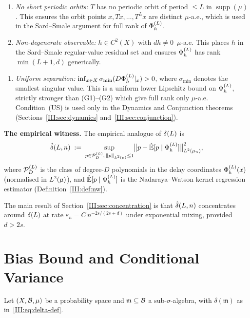 \begin{enumerate}[label=(G\arabic*)]
  \item \emph{No short periodic orbits:}
    $T$ has no periodic orbit of period $\leq L$ in $\operatorname{supp}(\mu)$.
    This ensures the orbit points $x, Tx, \ldots, T^L x$ are distinct
    $\mu$-a.e., which is used in the Sard--Smale argument for full rank of
    $\Phi_h^{(L)}$.

  \item \emph{Non-degenerate observable:}
    $h \in C^2(X)$ with $dh \neq 0$~$\mu$-a.e.
    This places $h$ in the Sard--Smale regular-value residual set and
    ensures $\Phi_h^{(L)}$ has rank $\min(L+1,d)$ generically.
\end{enumerate}

\begin{enumerate}[label=(US)]
  \item \emph{Uniform separation:}
    $\inf_{x \in X} \sigma_{\min}(D\Phi_h^{(L)}|_x) > 0$,
    where $\sigma_{\min}$ denotes the smallest singular value.
    This is a uniform lower Lipschitz bound on $\Phi_h^{(L)}$, strictly stronger than
    (G1)--(G2) which give full rank only $\mu$-a.e.
    Condition~(US) is used only in the Dynamics and Conjunction theorems
    (Sections~\ref{III:sec:dynamics} and~\ref{III:sec:conjunction}).
\end{enumerate}

\textbf{The empirical witness.}\enspace
The empirical analogue of $\delta(L)$ is
\[
  \hat{\delta}(L,n)
  \;:=\;
  \sup_{p \in \mathcal{P}_D^{(L)},\, \|p\|_{L^{2}(\mu)} \leq 1}
  \bigl\|p - \hat{\mathbb{E}}[p \mid \Phi_h^{(L)}]\bigr\|_{L^{2}(\mu_n)}^2,
\]
where $\mathcal{P}_D^{(L)}$ is the class of degree-$D$ polynomials in the delay coordinates
$\Phi_h^{(L)}(x)$ (normalised in $L^{2}(\mu)$), and $\hat{\mathbb{E}}[p \mid \Phi_h^{(L)}]$ is the
Nadaraya--Watson kernel regression estimator (Definition~\ref{III:def:nw}).

The main result of Section~\ref{III:sec:concentration} is that $\hat{\delta}(L,n)$
concentrates around $\delta(L)$ at rate $\varepsilon_n = C\,n^{-2s/(2s+d)}$
under exponential mixing, provided $d > 2s$.

\section{Bias Bound and Conditional Variance}
\label{III:sec:bias}

Let $(X, \mathcal{B}, \mu)$ be a probability space and $\mathfrak{m} \subseteq \mathcal{B}$
a sub-$\sigma$-algebra, with $\delta(\mathfrak{m})$ as in~\eqref{III:eq:delta-def}.

